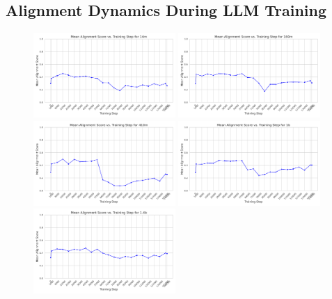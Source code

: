 \documentclass[10pt,a4paper]{article}
\begin{document}
\subsection{Alignment Dynamics During LLM Training}
\begin{figure}[H]
    \centering
    \includegraphics[width=0.48\textwidth]{mean_alignment_score_14m.png}
    \includegraphics[width=0.48\textwidth]{mean_alignment_score_160m.png}
    \includegraphics[width=0.48\textwidth]{mean_alignment_score_410m.png}
    \includegraphics[width=0.48\textwidth]{mean_alignment_score_1b.png}
    \includegraphics[width=0.48\textwidth]{mean_alignment_score_1.4b.png}

\end{figure}
\end{document}
